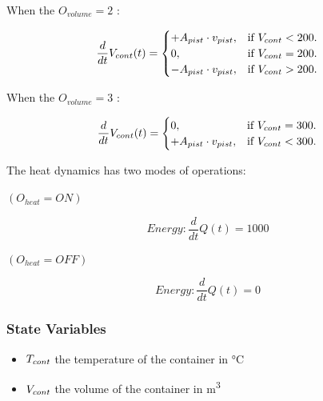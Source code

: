 \documentclass[a4paper,12pt,twoside,openright]{book}
\begin{document}
When the $O_{volume} = 2$ :

\begin{equation}
  \frac{d}{dt}V_{cont}(t)=\begin{cases}
    +A_{pist} \cdot v_{pist}  , & \text{if $V_{cont}<200$}.\\
    0, & \text{if $V_{cont}=200$}.\\
    -A_{pist} \cdot v_{pist}, & \text{if $V_{cont}>200$}.
  \end{cases}
\end{equation}

When the $O_{volume} = 3$ :


\begin{equation}
  \frac{d}{dt}V_{cont}(t)=\begin{cases}
    0, & \text{if $V_{cont}=300$}.\\
    +A_{pist} \cdot v_{pist}, & \text{if $V_{cont}<300$}.
  \end{cases}
\end{equation}


\vspace{5mm}

The heat dynamics has two modes of operations:

\vspace{5mm}

$(O_{heat} = ON)$

\begin{equation}
        Energy:
        \frac{d}{dt}Q(t) = 1000  
\end{equation}

\vspace{5mm}

$(O_{heat} = OFF)$

\begin{equation}
        Energy:
        \frac{d}{dt}Q(t) = 0  
\end{equation}

\vspace{5mm}

\subsubsection{State Variables}

\begin{itemize}
\item
  $T_{cont}$ the temperature of the container in \si{\degreeCelsius}
\item
  $V_{cont}$ the volume of the container in \si{\metre^3}

\end{itemize}
\end{document}
